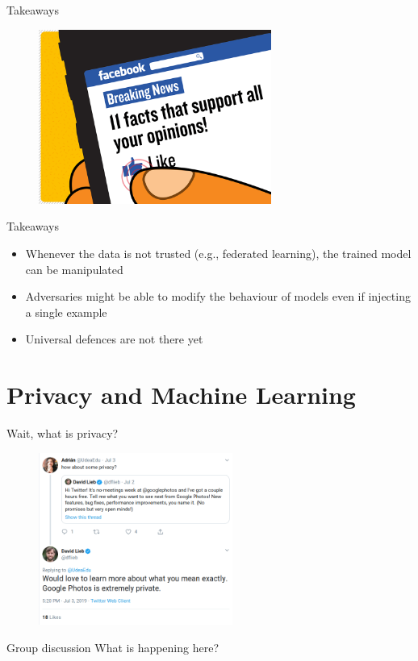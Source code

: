 \documentclass[10pt]{beamer}
\begin{document}
\begin{frame}[fragile]{Takeaways}
  \begin{figure}
    \includegraphics[width=3in]{echo_chamber.png}
  \end{figure}
\end{frame}


\begin{frame}[fragile]{Takeaways}
  \begin{itemize}[<+-| alert@+>]
    \item Whenever the data is not trusted (e.g., federated learning), the trained model can be
      manipulated
    \item Adversaries might be able to modify the behaviour of models even if injecting a single example
    \item Universal defences are not there yet
  \end{itemize}
\end{frame}


\section{Privacy and Machine Learning}


\begin{frame}{Wait, what is privacy?}
  \begin{figure}
    \centering
    \includegraphics[width=2.5in]{google_photos.png}
  \end{figure}
  \begin{alertblock}{Group discussion}
    What is happening here?
  \end{alertblock}
\end{frame}
\end{document}
